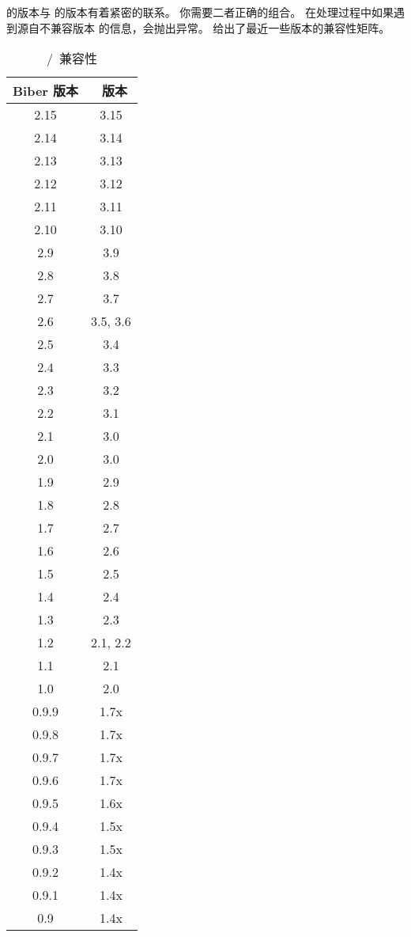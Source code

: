 
\biber 的版本与 \biblatex 的版本有着紧密的联系。
你需要二者正确的组合。
在处理过程中如果遇到源自不兼容版本 \biblatex 的信息，\biber 会抛出异常。
 给出了最近一些版本的兼容性矩阵。

\begin{table}
	\tablesetup\centering
	\begin{tabular}{cc}
		\toprule
		\sffamily\bfseries\spotcolor Biber 版本
		& \sffamily\bfseries\spotcolor \biblatex\ 版本\\
		\midrule
2.15 & 3.15\\
2.14 & 3.14\\
2.13 & 3.13\\
2.12 & 3.12\\
                2.11 & 3.11\\
                2.10 & 3.10\\
		2.9 & 3.9\\
		2.8 & 3.8\\
		2.7 & 3.7\\
		2.6 & 3.5, 3.6\\
		2.5 & 3.4\\
		2.4 & 3.3\\
		2.3 & 3.2\\
		2.2 & 3.1\\
		2.1 & 3.0\\
		2.0 & 3.0\\
		1.9 & 2.9\\
		1.8 & 2.8\\
		1.7 & 2.7\\
		1.6 & 2.6\\
		1.5 & 2.5\\
		1.4 & 2.4\\
		1.3 & 2.3\\
		1.2 & 2.1, 2.2\\
		1.1 & 2.1\\
		1.0 & 2.0\\
		0.9.9 & 1.7x\\
		0.9.8 & 1.7x\\
		0.9.7 & 1.7x\\
		0.9.6 & 1.7x\\
		0.9.5 & 1.6x\\
		0.9.4 & 1.5x\\
		0.9.3 & 1.5x\\
		0.9.2 & 1.4x\\
		0.9.1 & 1.4x\\
		0.9 & 1.4x\\
		\bottomrule
	\end{tabular}
	\caption{\biber/\biblatex\ 兼容性}
	\label{tab:int:pre:bibercompat}
\end{table}
